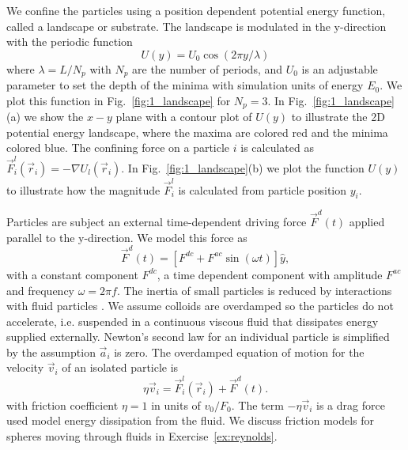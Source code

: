 \documentclass[twocolumn,preprintnumbers,amsmath,amssymb,aps,prb]{revtex4}
\begin{document}
We confine the particles using a position dependent 
potential energy function, called a landscape or substrate.
The landscape is modulated in the y-direction
with the periodic function 
 \begin{equation}
   U(y) = U_0 \cos{(2 \pi y / \lambda)}
     \label{eq:ysubstrate}
\end{equation}
 where $\lambda=L/N_p$ with $N_p$ are the number of periods,
 and $U_0$ is an adjustable parameter
 to set the depth of the minima
 with simulation units of energy $E_0$. 
 We plot this function in 
 Fig.~\ref{fig:1_landscape}
 for $N_p = 3$. 
 In Fig.~\ref{fig:1_landscape}(a) we show 
 the $x-y$ plane with a contour plot of $U(y)$ 
 to illustrate
 the 2D potential energy landscape,
 where 
 the maxima are colored red and the minima colored blue.
 The confining force on a particle $i$
 is calculated as 
 $\vec{F}^{l}_i(\vec{r}_i) = -\nabla U_l(\vec{r}_i)$.
 In Fig.~\ref{fig:1_landscape}(b) we plot the function
 $U(y)$ to illustrate how the magnitude
 $\vec{F}^{l}_i$ is calculated from particle position $y_i$.  
 
 Particles are subject an external time-dependent driving force
$\vec{F}^{d}(t)$
applied parallel to the y-direction.
We model this force as
\begin{equation}
  \vec{F}^{d}(t) = [F^{dc} + F^{ac} \sin(\omega t)] \hat{y},
    \label{eq:drive}
\end{equation}
with 
a constant component $F^{dc}$,
a time dependent component with amplitude $F^{ac}$
and frequency $\omega = 2 \pi f$.
The inertia of 
small particles is reduced by interactions
with fluid particles \cite{Purcell1977}.
We assume 
colloids are
overdamped
so the particles do not accelerate,
i.e. suspended in a continuous viscous fluid
that dissipates energy supplied externally. 
Newton's second law for an individual particle
is simplified
by the assumption $\vec{a}_i$ is zero. 
The overdamped equation of motion for
the velocity $\vec{v}_i$ of 
an isolated particle is
\begin{equation}
  \eta \vec{v}_i = \vec{F}^l_{i}(\vec{r}_i) + \vec{F}^{d}(t).
    \label{eq:motion}
\end{equation}
with friction coefficient $\eta = 1$ in units of $v_0 / F_0$. 
The term $-\eta \vec{v}_i$
is a drag force used model 
energy dissipation from the fluid. 
We discuss friction models for
spheres moving through fluids in 
Exercise~\ref{ex:reynolds}. 
\end{document}
